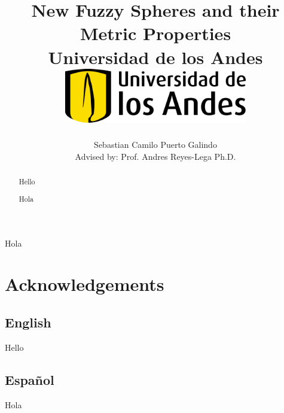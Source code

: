 \documentclass[12pt]{report}
\title 
{
	{New Fuzzy Spheres and their Metric Properties}\\
	{\large Universidad de los Andes}\\
	\vspace{1.5cm}
	{\includegraphics[width = 0.6\textwidth]{logo.png}}	
}
\author{Sebastian Camilo Puerto Galindo\\[1cm]{\small Advised by: Prof. Andres Reyes-Lega Ph.D.}}
\newenvironment{dedication}
  {\clearpage           %
   \thispagestyle{empty}%
   \vspace*{\stretch{1}}%
   \raggedleft          %
  }
  {\par %
   \vspace{\stretch{3}} %
   \clearpage           %
  }
\theoremstyle{definition}
\begin{document}

\maketitle

\begin{dedication}
{\LARGE\calligra Hola}
\end{dedication}

\begin{abstract}
Hello
\end{abstract}

\begin{otherlanguage}{spanish}
\begin{abstract}
Hola
\end{abstract}
\end{otherlanguage}

\newpage

\chapter*{Acknowledgements}

\section*{English}
Hello
\begin{otherlanguage}{spanish}
\section*{Español}
Hola
\end{otherlanguage}

\tableofcontents





\setcounter{chapter}{0}
\end{document}
